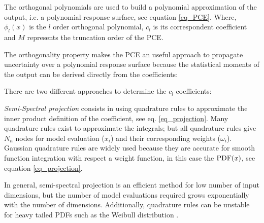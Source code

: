 \documentclass[preprint,12pt]{elsarticle}
\begin{document}
The orthogonal polynomials are used to build a polynomial approximation of the output, i.e. a polynomial response surface, see equation \ref{eq_PCE}. Where, $\phi_{l} (x)$ is the $l$ order orthogonal polynomial, $c_l$ is its correspondent coefficient and $M$ represents the truncation order of the PCE.


The orthogonality property makes the PCE an useful approach to propagate uncertainty over a polynomial response surface because the statistical moments of the output can be derived directly from the coefficients:





There are two different approaches to determine the $c_l$ coefficients:

\emph{Semi-Spectral projection} consists in using quadrature rules to approximate the inner product definition of the coefficient, see eq. \ref{eq_projection}. Many quadrature rules exist to approximate the integrals; but all quadrature rules give $N_n$ nodes for model evaluation ($x_i$) and their corresponding weights ($\omega_i$). Gaussian quadrature rules are widely used because they are accurate for smooth function integration with respect a weight function, in this case the $\mathrm{PDF}(x)$, see equation \ref{eq_projection}.


\noindent In general, semi-spectral projection is an efficient method for low number of input dimensions, but the number of model evaluations required grows exponentially with the number of dimensions. Additionally, quadrature rules can be unstable for heavy tailed PDFs such as the Weibull distribution \cite{gautschi1994algorithm}.
\end{document}
